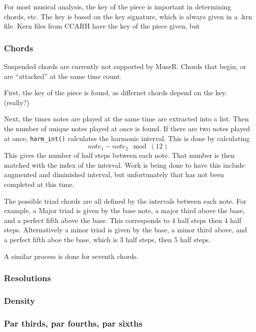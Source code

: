\documentclass[12pt,twoside]{reedthesis}
\theoremstyle{definition}
\theoremstyle{definition}
\theoremstyle{definition}
\theoremstyle{remark}
\begin{document}
For most musical analysis, the key of the piece is important in
determining chords, etc. The key is based on the key signature, which is
always given in a .krn file. Kern files from CCARH have the key of the
piece given, but

\subsubsection{Chords}\label{chords}

Suspended chords are currently not supported by MuseR. Chords that
begin, or are ``attacked'' at the same time count.

First, the key of the piece is found, as differnet chords depend on the
key. (really?)

Next, the times notes are played at the same time are extracted into a
list. Then the number of unique notes played at once is found. If there
are two notes played at once, \texttt{harm\_int()} calculates the
harmonic interval. This is done by calculating
\[note_1 - note_2 \mod(12)\] This gives the number of half steps between
each note. That number is then matched with the index of the interval.
Work is being done to have this include augmented and diminished
interval, but unfortunately that has not been completed at this time.

The possible triad chords are all defined by the intervals between each
note. For example, a Major triad is given by the base note, a major
third above the base, and a perfect fifth above the base. This
corresponds to 4 half steps then 4 half steps. Alternatively a minor
triad is given by the base, a minor third above, and a perfect fifth
aboe the base, which is 3 half steps, then 5 half steps.

A similar process is done for seventh chords.

\subsubsection{Resolutions}\label{resolutions}

\subsubsection{Density}\label{density}

\subsubsection{Par thirds, par fourths, par
sixths}\label{par-thirds-par-fourths-par-sixths}
\end{document}
